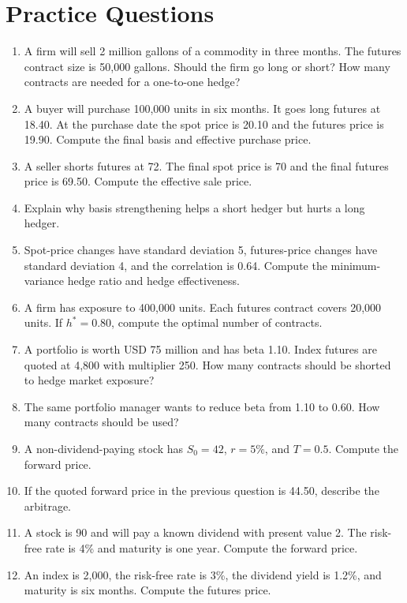 \section{Practice Questions}

\begin{enumerate}
    \item A firm will sell 2 million gallons of a commodity in three months. The
    futures contract size is 50,000 gallons. Should the firm go long or short?
    How many contracts are needed for a one-to-one hedge?
    \item A buyer will purchase 100,000 units in six months. It goes long
    futures at 18.40. At the purchase date the spot price is 20.10 and the
    futures price is 19.90. Compute the final basis and effective purchase
    price.
    \item A seller shorts futures at 72. The final spot price is 70 and the
    final futures price is 69.50. Compute the effective sale price.
    \item Explain why basis strengthening helps a short hedger but hurts a long
    hedger.
    \item Spot-price changes have standard deviation 5, futures-price changes
    have standard deviation 4, and the correlation is 0.64. Compute the
    minimum-variance hedge ratio and hedge effectiveness.
    \item A firm has exposure to 400,000 units. Each futures contract covers
    20,000 units. If $h^*=0.80$, compute the optimal number of contracts.
    \item A portfolio is worth USD 75 million and has beta 1.10. Index futures
    are quoted at 4,800 with multiplier 250. How many contracts should be
    shorted to hedge market exposure?
    \item The same portfolio manager wants to reduce beta from 1.10 to 0.60.
    How many contracts should be used?
    \item A non-dividend-paying stock has $S_0=42$, $r=5\%$, and $T=0.5$.
    Compute the forward price.
    \item If the quoted forward price in the previous question is 44.50,
    describe the arbitrage.
    \item A stock is 90 and will pay a known dividend with present value 2. The
    risk-free rate is 4\% and maturity is one year. Compute the forward price.
    \item An index is 2,000, the risk-free rate is 3\%, the dividend yield is
    1.2\%, and maturity is six months. Compute the futures price.

\end{enumerate}
